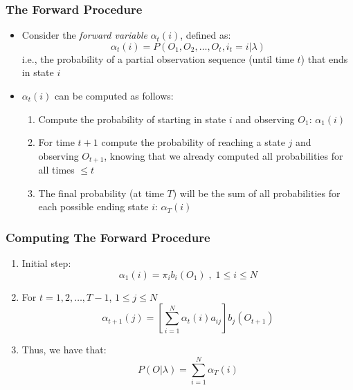 \documentclass{beamer}
\begin{document}

\begin{frame} \frametitle{The Forward Procedure}

  \begin{itemize}
  \item Consider the \emph{forward variable} $\alpha_t(i)$, defined as:
    \begin{displaymath}
      \alpha_t(i) = P(O_1, O_2, \dotsc, O_t, i_t = i|\lambda)
    \end{displaymath}
    i.e., the probability of a partial observation sequence (until time $t$)
    that ends in state $i$
  \item $\alpha_t(i)$ can be computed as follows:
    \begin{enumerate}
    \item Compute the probability of starting in state $i$ and observing $O_1$:
      $\alpha_1(i)$
    \item For time $t+1$ compute the probability of reaching a state $j$ and
      observing $O_{t+1}$, knowing that we already computed all probabilities
      for all times $\leq t$
    \item The final probability (at time $T$) will be the sum of all
      probabilities for each possible ending state $i$:  $\alpha_T(i)$
    \end{enumerate}
  \end{itemize}
  
\end{frame}


\begin{frame} \frametitle{Computing The Forward Procedure}

  \begin{block}{}
    \begin{enumerate}[<+->]
    \item Initial step:
      \begin{displaymath}
        \alpha_1(i) = \pi_ib_i(O_1) \; , \; 1 \leq i \leq N
      \end{displaymath}
    \item For $t = 1, 2, \dotsc, T-1$, $1 \leq j \leq N$
      \begin{displaymath}
        \alpha_{t+1}(j) = \left[ \sum_{i=1}^N \alpha_t(i)a_{ij} \right]b_j(O_{t+1})
      \end{displaymath}
    \item Thus, we have that:
      \begin{displaymath}
        P(O|\lambda) = \sum_{i=1}^N \alpha_T(i)
      \end{displaymath}
    \end{enumerate}
  \end{block}
  
\end{frame}
\end{document}
